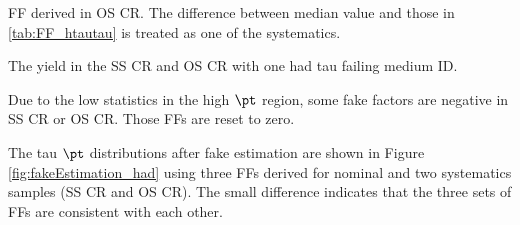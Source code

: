 \begin{enumerate}
\begin{table}[H]
\caption{FF derived in OS CR. The difference between median value and those in \ref{tab:FF_htautau} is treated as one of the systematics.}
\label{tab:FF_sb}

\end{table}

\begin{table}[H]
\caption{The yield in the SS CR and OS CR with one had tau failing medium ID.}
\label{tab:hadronic_nmCR_yield}


\end{table}

\end{enumerate}




Due to the low statistics in the high $\pt$ region, some fake factors are negative in SS CR or OS CR. Those FFs are reset to zero.

The tau $\pt$ distributions after fake estimation are shown in Figure \ref{fig:fakeEstimation_had} using three FFs derived for nominal and two systematics
samples (SS CR and OS CR). The small difference indicates that the three sets of FFs are consistent with each other.






\clearpage
